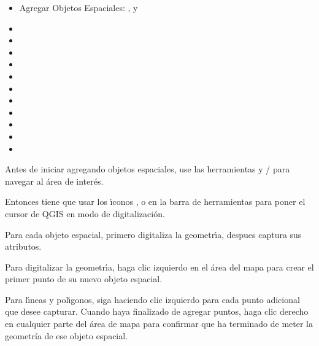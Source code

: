 \begin{itemize}
\item Agregar Objetos Espaciales: ,
   y
\item {}
\item {}
\item {}
\item {}
\item {}
\item {}
\item {}
\item {}
\item {}
\item {}
\item {}
\end{itemize}


Antes de iniciar agregando objetos espaciales, use las herramientas 
y / 
para navegar al \'area de inter\'es.

Entonces tiene que usar los \'{\i}conos ,
 o
 en la barra de herramientas para poner el cursor de QGIS
en modo de digitalizaci\'on.

Para cada objeto espacial, primero digitaliza la geometr\'{\i}a, despues captura sus atributos.

Para digitalizar la geometr\'{\i}a, haga clic izquierdo en el \'area del mapa para crear el primer
punto de su nuevo objeto espacial.

Para l\'{\i}neas y pol\'{\i}gonos, siga haciendo clic izquierdo para cada punto adicional
que desee capturar. Cuando haya finalizado de agregar puntos,
haga clic derecho en cualquier parte del \'area de mapa para confirmar que ha terminado de meter
la geometr\'{i}a de ese objeto espacial.

